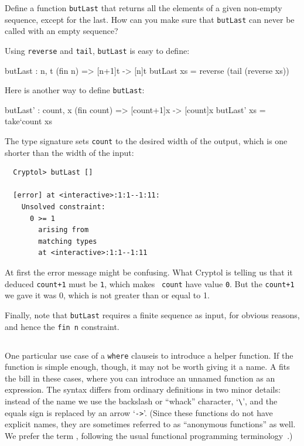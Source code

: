 \begin{Exercise}\label{ex:fn:3}
  Define a function {\tt butLast} that returns all the elements of a
  given non-empty sequence, except for the last.  How can you make
  sure that {\tt butLast} can never be called with an empty sequence?
  \indReverse\indTail
\end{Exercise}
\begin{Answer}
  Using {\tt reverse} and {\tt tail}, {\tt butLast} is easy to
  define:\indReverse\indTail
\begin{code}
  butLast : {n, t} (fin n) => [n+1]t -> [n]t
  butLast xs = reverse (tail (reverse xs))
\end{code}
Here is another way to define {\tt butLast}:
\begin{code}
  butLast' : {count, x} (fin count) => [count+1]x -> [count]x
  butLast' xs = take`{count} xs
\end{code}
The type signature sets {\tt count} to the desired width of the
output, which is one shorter than the width of the input:\indSignature
\begin{Verbatim}
  Cryptol> butLast []

  [error] at <interactive>:1:1--1:11:
    Unsolved constraint:
      0 >= 1
        arising from
        matching types
        at <interactive>:1:1--1:11
\end{Verbatim}
At first the error message might be confusing. What Cryptol is telling
us that it deduced {\tt count+1} must be {\tt 1}, which makes {\tt
  count} have value {\tt 0}.  But the {\tt count+1} we gave it was 0,
which is not greater than or equal to 1.

Finally, note that {\tt butLast} requires a finite sequence as input,
for obvious reasons, and hence the {\tt fin n} constraint.
\end{Answer}

\subsection{\texorpdfstring{\lamexs}{Lambda-expressions}}\label{sec:lamex}

One particular use case of a {\tt where} clause\indWhere is to
introduce a helper function. If the function is simple enough, though,
it may not be worth giving it a name. A \lamex fits the bill in these
cases, where you can introduce an unnamed function as an
expression. The syntax differs from ordinary definitions in two minor
details: instead of the name we use the backslash or ``whack''
character, `{\tt \Verb|\|}', and the equals sign is replaced by an
arrow `{\tt ->}'.  (Since these functions do not have explicit names,
they are sometimes referred to as ``anonymous functions'' as well. We
prefer the term \lamex, following the usual functional programming
terminology~\cite{Has98}.)

